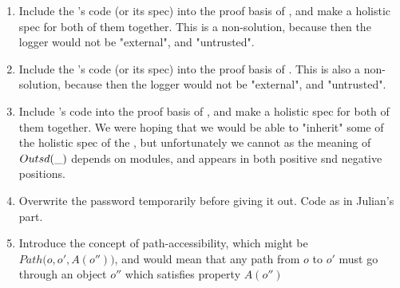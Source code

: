 \begin{enumerate}
\item
Include the 's code (or its spec) into the proof basis of , and make a holistic spec for both of them together. This is a non-solution, because then the logger would not be "external", and "untrusted".
\item
Include the 's code (or its spec) into the proof basis of . This is also a non-solution, because then the logger would not be "external", and "untrusted".
\item
Include  's code  into the proof basis of , and make a holistic spec for both of them together. We were hoping that we would be able to "inherit" some of the holistic spec of the , but unfortunately we cannot as the meaning of $Outsd(\_)$ depends on modules, and appears in both positive snd negative positions.
\item
Overwrite the password temporarily before giving it out. Code as in Julian's part.
\item
Introduce the concept of path-accessibility, which might be $Path( {o}, {o'}, {A(o''))}$, and would mean that any path from $o$ to $o'$  must go through an object $o''$ which satisfies  property $A(o'')$

\end{enumerate}

